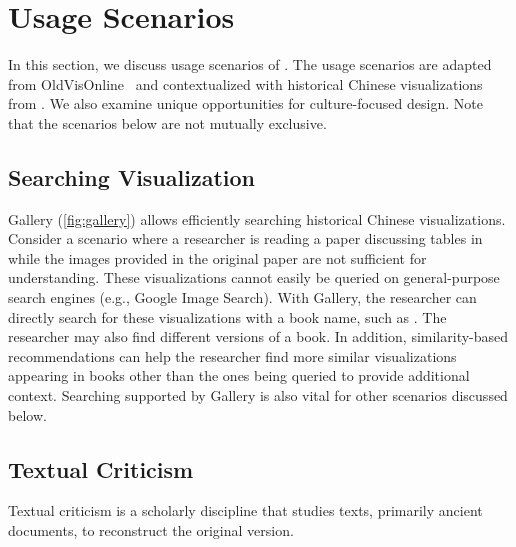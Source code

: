 \section{Usage Scenarios}
\label{sec:usage-scenarios}

In this section, we discuss usage scenarios of \datasetName.
The usage scenarios are adapted from OldVisOnline~\cite{Zhang2024OldVisOnline} and contextualized with historical Chinese visualizations from \datasetName.
We also examine unique opportunities for culture-focused design.
Note that the scenarios below are not mutually exclusive.

\subsection{Searching Visualization}

\datasetName Gallery (\cref{fig:gallery}) allows efficiently searching historical Chinese visualizations.
Consider a scenario where a researcher is reading a paper discussing tables in  while the images provided in the original paper are not sufficient for understanding.
These visualizations cannot easily be queried on general-purpose search engines (e.g., Google Image Search). 
With \datasetName Gallery, the researcher can directly search for these visualizations with a book name, such as . 
The researcher may also find different versions of a book.
In addition, similarity-based recommendations can help the researcher find more similar visualizations appearing in books other than the ones being queried to provide additional context.
Searching supported by \datasetName Gallery is also vital for other scenarios discussed below.

\subsection{Textual Criticism}

Textual criticism is a scholarly discipline that studies texts, primarily ancient documents, to reconstruct the original version.

